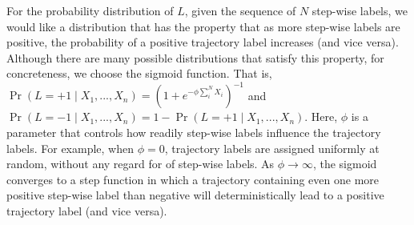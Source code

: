 For the probability distribution of $L$, given the sequence of $N$
step-wise labels, we would like a distribution that has the property
that as more step-wise labels are positive, the probability of a
positive trajectory label increases (and vice versa). Although there
are many possible distributions that satisfy this property, for
concreteness, we choose the sigmoid function. That is,
%
$\Pr(L = +1 \mid X_1, ..., X_n) = (1 + e^{-\phi \sum_i^N X_i})^{-1}$ and
$\Pr(L = -1 \mid X_1, ... ,X_n) = 1 - \Pr(L = +1 \mid X_1, ..., X_n)$.
%
Here, $\phi$ is a parameter that controls how readily step-wise labels
influence the trajectory labels.  For example, when $\phi = 0$,
trajectory labels are assigned uniformly at random, without any regard
for of step-wise labels.  As $\phi \rightarrow \infty$, the sigmoid
converges to a step function in which a trajectory containing even one
more positive step-wise label than negative will deterministically
lead to a positive trajectory label (and vice versa).


